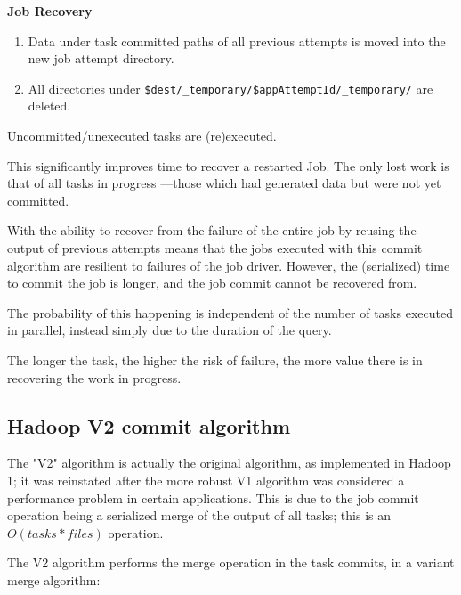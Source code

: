 \documentclass[conference]{IEEEtran}
\begin{document}
\textbf{Job Recovery}

\begin{enumerate}

\item Data under task committed paths of all previous attempts is moved
into the new job attempt directory.
\item All directories under \texttt{\$dest/\_temporary/\$appAttemptId/\_temporary/}
are deleted.
\end{enumerate}

Uncommitted/unexecuted tasks are (re)executed.

This significantly improves time to recover a restarted Job.
The only lost work is that of all tasks in progress ---those which had generated
data but were not yet committed.


With the ability to recover from the failure of the entire job by
reusing the output of previous attempts means that the jobs executed
with this commit algorithm are resilient to failures of the job driver.
However, the (serialized) time to commit the job is longer, and the job
commit cannot be recovered from.


The probability of this happening is independent of the number
of tasks executed in parallel, instead simply due to the duration of the query.

The longer the task, the higher the risk of failure, the more value there is
in recovering the work in progress.


\subsection{Hadoop V2 commit algorithm}
\label{subsec:hadoopV2CommitAlgorithm}

The "V2" algorithm is actually the original algorithm, as implemented
in Hadoop 1;
it was reinstated after the more robust V1 algorithm was considered
a performance problem in certain applications.
This is due to the job commit operation being a serialized merge of
the output of all tasks;
this is an $O(tasks * files)$ operation.

The V2 algorithm performs the merge operation in the task commits,
in a variant merge algorithm:
\end{document}
